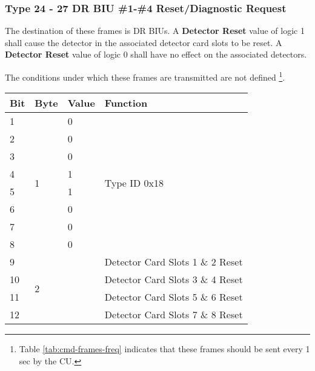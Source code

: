 \documentclass[]{article}
\begin{document}
\clearpage
\subsubsection {Type 24 - 27 DR BIU \#1-\#4 Reset/Diagnostic Request}

The destination of these frames is DR BIUs. A \textbf{Detector Reset} value of logic 1 shall cause the detector in the associated detector card slots to be reset. A \textbf{Detector Reset} value of logic 0 shall have no effect on the associated detectors.

The conditions under which these frames are transmitted are not defined \footnote{Table \ref{tab:cmd-frames-freq} indicates that these frames should be sent every 1 sec by the CU.}.

\begin{table}[ht]
	\centering
	\begin{tabular}{llll}
		\hline
		\textbf{Bit} & \textbf{Byte}      & \textbf{Value}    & \textbf{Function}                \\ \hline
		1            & \multirow{8}{*}{1} & 0                 & \multirow{8}{*}{Type ID 0x18}    \\
		2            &                    & 0                 &                                  \\
		3            &                    & 0                 &                                  \\
		4            &                    & 1                 &                                  \\
		5            &                    & 1                 &                                  \\
		6            &                    & 0                 &                                  \\
		7            &                    & 0                 &                                  \\
		8            &                    & 0                 &                                  \\ \hline
		9            & \multirow{8}{*}{2} & \multirow{4}{*}{} & Detector Card Slots 1 \& 2 Reset \\
		10           &                    &                   & Detector Card Slots 3 \& 4 Reset \\
		11           &                    &                   & Detector Card Slots 5 \& 6 Reset \\
		12           &                    &                   & Detector Card Slots 7 \& 8 Reset \\ \cline{3-4} 

\end{tabular}
\end{table}
\end{document}
